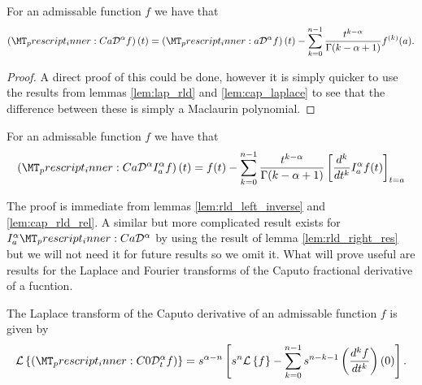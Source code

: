 \begin{mdframed}[innertopmargin=10pt]
\begin{lemma}
    \label{lem:cap_rld_rel}
    For an admissable function $ f $ we have that
    \begin{align}
        \left(\prescript{C}{a}{\mathcal{D}}^\alpha f\right)(t) = \left( \prescript{}{a}{\mathcal{D}}^\alpha f \right)(t) - \sum_{k=0}^{n-1} \frac{t^{k-\alpha}}{\Gamma(k - \alpha + 1)}f^{(k)}(a).
    \end{align}
\end{lemma}
\end{mdframed}
\begin{proof}
 A direct proof of this could be done, however it is simply quicker to use the results from lemmas \ref{lem:lap_rld} and \ref{lem:cap_laplace} to see that the difference between these is simply a Maclaurin polynomial. 
\end{proof}
\begin{mdframed}[innertopmargin=10pt]
\begin{lemma}
    For an admissable function $ f $ we have that
    \begin{align}
        \left(\prescript{C}{a}{\mathcal{D}}^\alpha I_a^\alpha f\right)(t) = f(t) - \sum_{k=0}^{n-1} \frac{t^{k-\alpha}}{\Gamma(k-\alpha+1)} \left[\frac{d^k}{dt^k}I_a^\alpha f(t) \right]_{t=a}
    \end{align}
\end{lemma}
\end{mdframed}
The proof is immediate from lemmas \ref{lem:rld_left_inverse} and \ref{lem:cap_rld_rel}.
A similar but more complicated result exists for $  I_a^\alpha \prescript{C}{a}{\mathcal{D}}^\alpha $ by using the result of lemma \ref{lem:rld_right_res} but we will not need it for future results so we omit it. What will prove useful are results for the Laplace and Fourier transforms of the Caputo fractional derivative of a fucntion.
\begin{mdframed}[innertopmargin=10pt]
\begin{lemma}
\label{lem:cap_laplace}
    The Laplace transform of the Caputo derivative of an admissable function $ f $ is given by
    \begin{align}
        \laplace{\capder{0}{t}{\alpha}{f}} = s^{\alpha - n} \left[ s^n \laplace{f} - \sum_{k=0}^{n-1} s^{n-k-1} \left( \der{f}{t}{k} \right)(0) \right].
    \end{align}
\end{lemma}
\end{mdframed}
